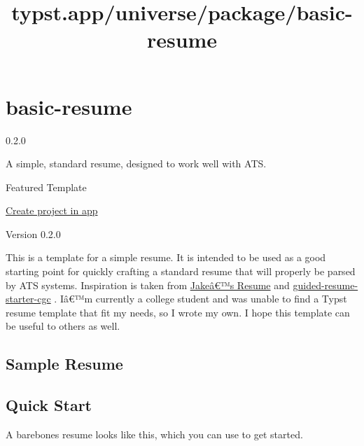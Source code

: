 \title{typst.app/universe/package/basic-resume}

\label{banner}
\label{template-thumbnail}

\section{basic-resume}\label{basic-resume}

{ 0.2.0 }

A simple, standard resume, designed to work well with ATS.

{ } Featured Template

\href{/app?template=basic-resume&version=0.2.0}{Create project in app}

\label{readme}
Version 0.2.0

This is a template for a simple resume. It is intended to be used as a
good starting point for quickly crafting a standard resume that will
properly be parsed by ATS systems. Inspiration is taken from
\href{https://github.com/jakegut/resume}{Jakeâ€™s Resume} and
\href{https://typst.app/universe/package/guided-resume-starter-cgc/}{guided-resume-starter-cgc}
. Iâ€™m currently a college student and was unable to find a Typst
resume template that fit my needs, so I wrote my own. I hope this
template can be useful to others as well.

\subsection{Sample Resume}\label{sample-resume}


\subsection{Quick Start}\label{quick-start}

A barebones resume looks like this, which you can use to get started.

